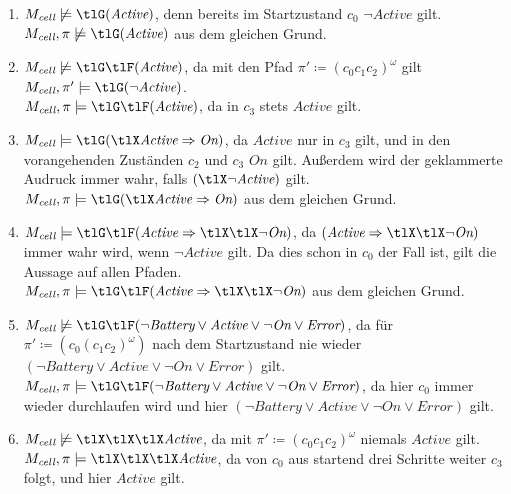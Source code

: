 \documentclass[12pt,a4paper]{../krautsourcing/homework}
\newcommand{\Mcell}{M_\textit{cell}}
\newcommand{\eBattery}{\textit{Battery}}
\newcommand{\eOn}{\textit{On}}
\newcommand{\eActive}{\textit{Active}}
\newcommand{\eError}{\textit{Error}}
\newcommand{\nmodels}{\not\models}
\begin{document}
\begin{enumerate}
\item
\(\Mcell \nmodels \tlG(\eActive)\), denn bereits im Startzustand \(c_0\) \(\lnot \eActive\) gilt.
\\
\(\Mcell, \pi \nmodels \tlG(\eActive)\) aus dem gleichen Grund.
\item
\(\Mcell \nmodels \tlG\tlF(\eActive)\), da mit den Pfad \(\pi' \coloneqq (c_0 c_1 c_2 )^\omega\) gilt \(\Mcell, \pi' \models \tlG(\lnot \eActive)\).
\\
\(\Mcell, \pi \models \tlG\tlF(\eActive)\), da in \(c_3\) stets \(\eActive\) gilt.
\item
\(\Mcell \models \tlG(\tlX \eActive \Rightarrow \eOn)\), da \(\eActive\) nur in \(c_3\) gilt, und in den vorangehenden Zuständen \(c_2\) und \(c_3\) \(\eOn\) gilt. Außerdem wird der geklammerte Audruck immer wahr, falls \((\tlX\lnot\eActive)\) gilt.
\\
\(\Mcell, \pi \models \tlG(\tlX \eActive \Rightarrow \eOn)\) aus dem gleichen Grund.
\item \(\Mcell \models \tlG\tlF(\eActive \Rightarrow \tlX\tlX \lnot \eOn)\), da \((\eActive \Rightarrow \tlX\tlX \lnot \eOn)\) immer wahr wird, wenn \(\lnot \eActive\) gilt. Da dies schon in \(c_0\) der Fall ist, gilt die Aussage auf allen Pfaden.
\\
\(\Mcell, \pi \models \tlG\tlF(\eActive \Rightarrow \tlX\tlX \lnot \eOn)\) aus dem gleichen Grund.
\item
\(\Mcell \nmodels \tlG\tlF(\lnot \eBattery \lor \eActive \lor \lnot \eOn \lor \eError)\), da für \(\pi' \coloneqq (c_0 (c_1 c_2)^\omega)\) nach dem Startzustand nie wieder \((\lnot \eBattery \lor \eActive \lor \lnot \eOn \lor \eError)\) gilt.
\\
\(\Mcell,\pi \models \tlG\tlF(\lnot \eBattery \lor \eActive \lor \lnot \eOn \lor \eError)\), da hier \(c_0\) immer wieder durchlaufen wird und hier \((\lnot \eBattery \lor \eActive \lor \lnot \eOn \lor \eError)\) gilt.
\item
\(\Mcell \nmodels \tlX\tlX\tlX \eActive\), da mit \(\pi' \coloneqq (c_0c_1c_2)^\omega\) niemals \(\eActive\) gilt.
\\
\(\Mcell, \pi \models \tlX\tlX\tlX \eActive\), da von \(c_0\) aus startend drei Schritte weiter \(c_3\) folgt, und hier \(\eActive\) gilt.
\end{enumerate}

\subsection{}
\end{document}
